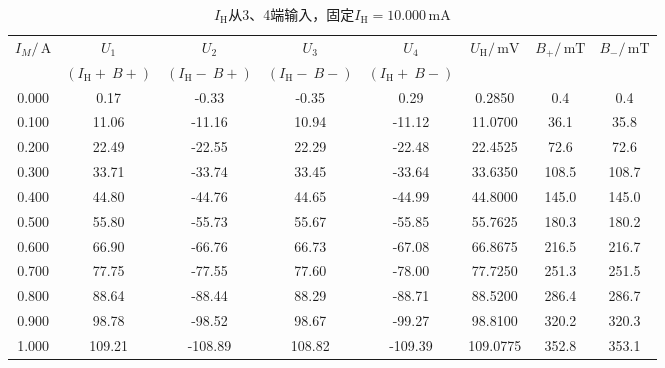 \documentclass[a4paper,fontset=windows]{ctexart}
\begin{document}
    \vspace{0.5em}
    \begin{table}[ht!]
        \begin{center}
            \caption*{$I_\mathrm{H}$从3、4端输入，固定$I_\mathrm{H} = 10.000\,\mathrm{mA}$}
            \begin{tabular}{ |c|c|c|c|c|c|c|c| }
                \hline
                \multirow{2}{*}{$I_M/\,\mathrm{A}$} & $U_1$ & $U_2$ & $U_3$ & $U_4$ & \multirow{2}{*}{$U_\mathrm{H}/\,\mathrm{mV}$} & \multirow{2}{*}{$B_+/\,\mathrm{mT}$} & \multirow{2}{*}{$B_-/\,\mathrm{mT}$} \\
                & $(I_\mathrm{H}+\ B+)$ & $(I_\mathrm{H}-\ B+)$ & $(I_\mathrm{H}-\ B-)$ & $(I_\mathrm{H}+\ B-)$ & & & \\
                \hline
                0.000 & 0.17 & -0.33 & -0.35 & 0.29 & 0.2850 & 0.4 & 0.4 \\
                \hline
                0.100 & 11.06 & -11.16 & 10.94 & -11.12 & 11.0700 & 36.1 & 35.8 \\
                \hline
                0.200 & 22.49 & -22.55 & 22.29 & -22.48 & 22.4525 & 72.6 & 72.6 \\
                \hline
                0.300 & 33.71 & -33.74 & 33.45 & -33.64 & 33.6350 & 108.5 & 108.7 \\
                \hline
                0.400 & 44.80 & -44.76 & 44.65 & -44.99 & 44.8000 & 145.0 & 145.0 \\
                \hline
                0.500 & 55.80 & -55.73 & 55.67 & -55.85 & 55.7625 & 180.3 & 180.2 \\
                \hline
                0.600 & 66.90 & -66.76 & 66.73 & -67.08 & 66.8675 & 216.5 & 216.7 \\
                \hline
                0.700 & 77.75 & -77.55 & 77.60 & -78.00 & 77.7250 & 251.3 & 251.5 \\
                \hline
                0.800 & 88.64 & -88.44 & 88.29 & -88.71 & 88.5200 & 286.4 & 286.7 \\
                \hline
                0.900 & 98.78 & -98.52 & 98.67 & -99.27 & 98.8100 & 320.2 & 320.3 \\
                \hline
                1.000 & 109.21 & -108.89 & 108.82 & -109.39 & 109.0775 & 352.8 & 353.1 \\
                \hline
            \end{tabular}
        \end{center}
    \end{table}
    \vspace{-0.5em}
\end{document}
